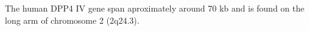 The human DPP4 IV gene span aproximately around 70 kb and is found on the long arm of chromosome 2 (2q24.3). 